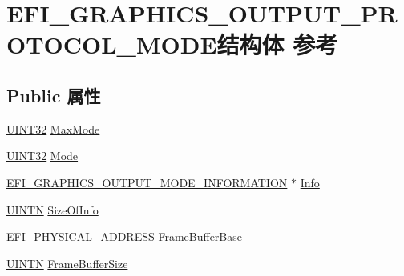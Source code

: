 \hypertarget{struct_e_f_i___g_r_a_p_h_i_c_s___o_u_t_p_u_t___p_r_o_t_o_c_o_l___m_o_d_e}{}\section{E\+F\+I\+\_\+\+G\+R\+A\+P\+H\+I\+C\+S\+\_\+\+O\+U\+T\+P\+U\+T\+\_\+\+P\+R\+O\+T\+O\+C\+O\+L\+\_\+\+M\+O\+D\+E结构体 参考}
\label{struct_e_f_i___g_r_a_p_h_i_c_s___o_u_t_p_u_t___p_r_o_t_o_c_o_l___m_o_d_e}
\subsection*{Public 属性}
\begin{DoxyCompactItemize}
\item 
\hyperlink{_processor_bind_8h_ae1e6edbbc26d6fbc71a90190d0266018}{U\+I\+N\+T32} \hyperlink{struct_e_f_i___g_r_a_p_h_i_c_s___o_u_t_p_u_t___p_r_o_t_o_c_o_l___m_o_d_e_a7bff1d62fc3f802af3c7fc1fe1c4d29b}{Max\+Mode}
\item 
\hyperlink{_processor_bind_8h_ae1e6edbbc26d6fbc71a90190d0266018}{U\+I\+N\+T32} \hyperlink{struct_e_f_i___g_r_a_p_h_i_c_s___o_u_t_p_u_t___p_r_o_t_o_c_o_l___m_o_d_e_a1047c147ece8a6f1ea9ce90b35203a18}{Mode}
\item 
\hyperlink{struct_e_f_i___g_r_a_p_h_i_c_s___o_u_t_p_u_t___m_o_d_e___i_n_f_o_r_m_a_t_i_o_n}{E\+F\+I\+\_\+\+G\+R\+A\+P\+H\+I\+C\+S\+\_\+\+O\+U\+T\+P\+U\+T\+\_\+\+M\+O\+D\+E\+\_\+\+I\+N\+F\+O\+R\+M\+A\+T\+I\+ON} $\ast$ \hyperlink{struct_e_f_i___g_r_a_p_h_i_c_s___o_u_t_p_u_t___p_r_o_t_o_c_o_l___m_o_d_e_ace057bea16d9ada0e793425ffb7133fd}{Info}
\item 
\hyperlink{_processor_bind_8h_ac0b1ca9b01db611e0f7f2080a2699135}{U\+I\+N\+TN} \hyperlink{struct_e_f_i___g_r_a_p_h_i_c_s___o_u_t_p_u_t___p_r_o_t_o_c_o_l___m_o_d_e_afa808d133f6aa432d3a6ba36e93cebe2}{Size\+Of\+Info}
\item 
\hyperlink{_uefi_base_type_8h_a31bc7e7faeab8d2940ee34f21d41cd04}{E\+F\+I\+\_\+\+P\+H\+Y\+S\+I\+C\+A\+L\+\_\+\+A\+D\+D\+R\+E\+SS} \hyperlink{struct_e_f_i___g_r_a_p_h_i_c_s___o_u_t_p_u_t___p_r_o_t_o_c_o_l___m_o_d_e_a704b598a57148fce4d2207fa54c2fe9b}{Frame\+Buffer\+Base}
\item 
\hyperlink{_processor_bind_8h_ac0b1ca9b01db611e0f7f2080a2699135}{U\+I\+N\+TN} \hyperlink{struct_e_f_i___g_r_a_p_h_i_c_s___o_u_t_p_u_t___p_r_o_t_o_c_o_l___m_o_d_e_ae2ff013bbe69a49ae86055f9b7542f12}{Frame\+Buffer\+Size}
\end{DoxyCompactItemize}


